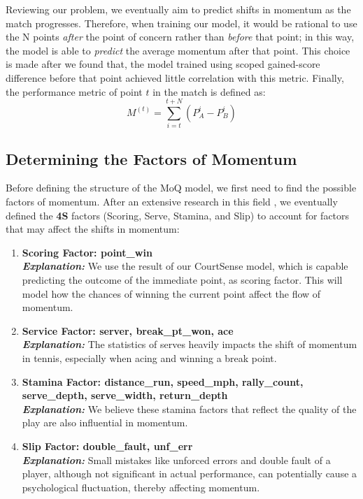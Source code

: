 \documentclass[12pt]{article}  %
\begin{document}
Reviewing our problem, we eventually aim to predict shifts in momentum as the match progresses. Therefore, when training our model, it would be rational to use the N points \textit{after} the point of concern rather than \textit{before} that point; in this way, the model is able to \textit{predict} the average momentum after that point. This choice is made after we found that, the model trained using scoped gained-score difference before that point achieved little correlation with this metric. Finally, the performance metric of point $t$ in the match is defined as:
\[
M^{(t)}=\sum_{i=t}^{t+N}(P_{A}^i-P_{B}^i)
\]

\subsection{Determining the Factors of Momentum}
Before defining the structure of the MoQ model, we first need to find the possible factors of momentum. After an extensive research in this field \cite{8} \cite{9}, we eventually defined the \textbf{4S} factors (Scoring, Serve, Stamina, and Slip) to account for factors that may affect the shifts in momentum:

\begin{enumerate}[\bfseries S1.]
	\item \textbf{Scoring Factor: point\_win}\\
	\textbf{\textit{Explanation: }}We use the result of our CourtSense model, which is capable predicting the outcome of the immediate point, as scoring factor. This will model how the chances of winning the current point affect the flow of momentum.
	\item \textbf{Service Factor: server, break\_pt\_won, ace}\\
	\textbf{\textit{Explanation: }}The statistics of serves heavily impacts the shift of momentum in tennis, especially when acing and winning a break point.
	\item \textbf{Stamina Factor: distance\_run, speed\_mph, rally\_count, serve\_depth, serve\_width, return\_depth}\\
	\textbf{\textit{Explanation: }}We believe these stamina factors that reflect the quality of the play are also influential in momentum.
	\item \textbf{Slip Factor: double\_fault, unf\_err}\\
	\textbf{\textit{Explanation: }}Small mistakes like unforced errors and double fault of a player, although not significant in actual performance, can potentially cause a psychological fluctuation, thereby affecting momentum. 
\end{enumerate}
\end{document}
